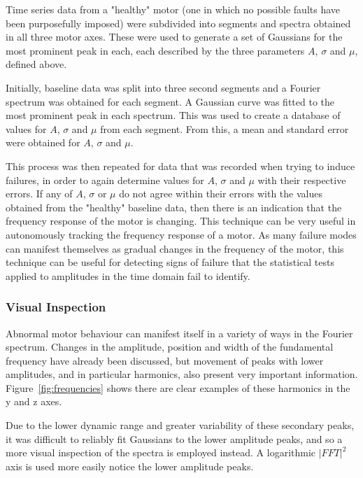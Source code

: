 Time series data from a "healthy" motor (one in which no possible faults have been purposefully imposed) were subdivided into segments and spectra obtained in all three motor axes. These were used to generate a set of Gaussians for the most prominent peak in each, each described by the three parameters $A$, $\sigma$ and $\mu$, defined above.

Initially, baseline data was split into three second segments and a Fourier spectrum was obtained for each segment. A Gaussian curve was fitted to the most prominent peak in each spectrum. This was used to create a database of values for $A$, $\sigma$ and $\mu$ from each segment. From this, a mean and standard error were obtained for $A$, $\sigma$ and $\mu$. 

This process was then repeated for data that was recorded when trying to induce failures, in order to again determine values for $A$, $\sigma$ and $\mu$ with their respective errors. If any of $A$, $\sigma$ or $\mu$ do not agree within their errors with the values obtained from the "healthy" baseline data, then there is an indication that the frequency response of the motor is changing. This technique can be very useful in autonomously tracking the frequency response of a motor. As many failure modes can manifest themselves as gradual changes in the frequency of the motor, this technique can be useful for detecting signs of failure that the statistical tests applied to amplitudes in the time domain fail to identify.

 
\subsubsection{Visual Inspection}
Abnormal motor behaviour can manifest itself in a variety of ways in the Fourier spectrum. Changes in the amplitude, position and width of the fundamental frequency have already been discussed, but movement of peaks with lower amplitudes, and in particular harmonics, also present very important information. Figure~\ref{fig:frequencies} shows there are clear examples of these harmonics in the y and z axes.

Due to the lower dynamic range and greater variability of these secondary peaks, it was difficult to reliably fit Gaussians to the lower amplitude peaks, and so a more visual inspection of the spectra is employed instead. A logarithmic $|FFT|^2$ axis is used more easily notice the lower amplitude peaks.

